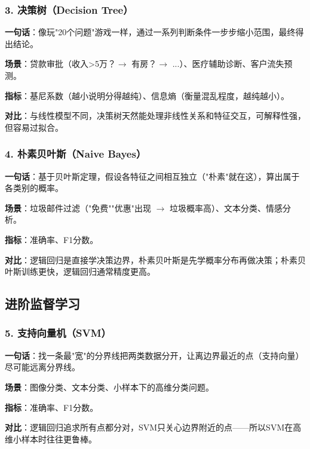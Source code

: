\documentclass[12pt,a4paper]{ctexart}
\begin{document}
\subsubsection{3. 决策树（Decision Tree）}

\begin{funbox}
\textbf{一句话}：像玩"20个问题"游戏一样，通过一系列判断条件一步步缩小范围，最终得出结论。

\textbf{场景}：贷款审批（收入>5万？$\to$ 有房？$\to$ ...）、医疗辅助诊断、客户流失预测。

\textbf{指标}：基尼系数（越小说明分得越纯）、信息熵（衡量混乱程度，越纯越小）。

\textbf{对比}：与线性模型不同，决策树天然能处理非线性关系和特征交互，可解释性强，但容易过拟合。
\end{funbox}

\subsubsection{4. 朴素贝叶斯（Naive Bayes）}

\begin{funbox}
\textbf{一句话}：基于贝叶斯定理，假设各特征之间相互独立（"朴素"就在这），算出属于各类别的概率。

\textbf{场景}：垃圾邮件过滤（"免费""优惠"出现 $\to$ 垃圾概率高）、文本分类、情感分析。

\textbf{指标}：准确率、F1分数。

\textbf{对比}：逻辑回归是直接学决策边界，朴素贝叶斯是先学概率分布再做决策；朴素贝叶斯训练更快，逻辑回归通常精度更高。
\end{funbox}

\subsection{进阶监督学习}

\subsubsection{5. 支持向量机（SVM）}

\begin{funbox}[SVM]
\textbf{一句话}：找一条最"宽"的分界线把两类数据分开，让离边界最近的点（支持向量）尽可能远离分界线。

\textbf{场景}：图像分类、文本分类、小样本下的高维分类问题。

\textbf{指标}：准确率、F1分数。

\textbf{对比}：逻辑回归追求所有点都分对，SVM只关心边界附近的点——所以SVM在高维小样本时往往更鲁棒。
\end{funbox}
\end{document}
